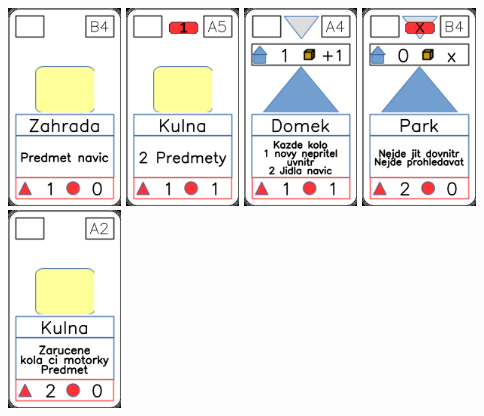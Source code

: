 \documentclass[a4paper]{article}
\begin{document}
	\includegraphics[width=3.0cm]{img-2_23}
	\includegraphics[width=3.0cm]{img-2_19}
	\includegraphics[width=3.0cm]{img-3_3}
	\includegraphics[width=3.0cm]{img-3_23}
	\includegraphics[width=3.0cm]{img-2_16}
\end{document}
